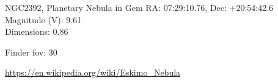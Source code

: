 \begin{block}{NGC2392, Planetary Nebula in Gem}
    RA: 07:29:10.76, Dec: +20:54:42.6 \\ 
    Magnitude (V): 9.61 \\ 
    Dimensions: 0.86 

    Finder fov: 30 

    \url{https://en.wikipedia.org/wiki/Eskimo_Nebula} 
\end{block}